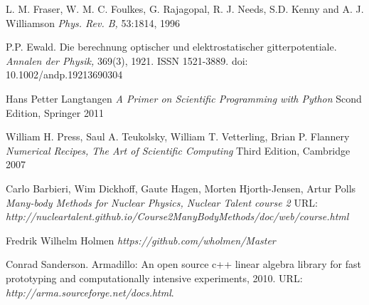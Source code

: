 \documentclass[twoside,english]{uiofysmaster}
\begin{document}
\begin{thebibliography}{9}
	L. M. Fraser, W. M. C. Foulkes, G. Rajagopal, R. J. Needs, S.D. Kenny and A. J. Williamson
	\textit{Phys. Rev. B,} 53:1814, 1996

	P.P. Ewald. Die berechnung optischer und elektrostatischer gitterpotentiale. 
	\textit{Annalen der Physik,} 369(3), 1921. ISSN 1521-3889. doi: 10.1002/andp.19213690304

	Hans Petter Langtangen
	\textit{A Primer on Scientific Programming with Python} Scond Edition, Springer 2011

	William H. Press, Saul A. Teukolsky, William T. Vetterling, Brian P. Flannery
	\textit{Numerical Recipes, The Art of Scientific Computing} Third Edition, Cambridge 2007

	Carlo Barbieri, Wim Dickhoff, Gaute Hagen, Morten Hjorth-Jensen, Artur Polls
	\textit{Many-body Methods for Nuclear Physics, Nuclear Talent course 2} 
	URL: \textit{http://nucleartalent.github.io/Course2ManyBodyMethods/doc/web/course.html}

	Fredrik Wilhelm Holmen
	\textit{https://github.com/wholmen/Master} 

	Conrad Sanderson. Armadillo: An open source c++ linear algebra library for fast prototyping and computationally intensive experiments, 2010.
	URL: \textit{http://arma.sourceforge.net/docs.html}.

\end{thebibliography}
\end{document}
